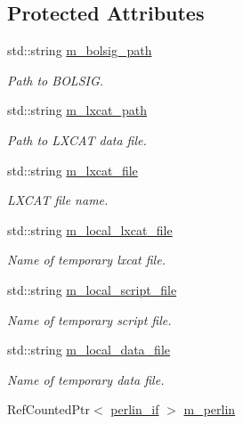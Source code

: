 \subsection*{Protected Attributes}
\begin{DoxyCompactItemize}
\item 
std\+::string \hyperlink{classair__bolsig_afe5060d9010503047c6d343384f66d8f}{m\+\_\+bolsig\+\_\+path}
\begin{DoxyCompactList}\small\item\em Path to B\+O\+L\+S\+IG. \end{DoxyCompactList}\item 
std\+::string \hyperlink{classair__bolsig_a8c7a6ec683fb0837a02b6c0ecb481d62}{m\+\_\+lxcat\+\_\+path}
\begin{DoxyCompactList}\small\item\em Path to L\+X\+C\+AT data file. \end{DoxyCompactList}\item 
std\+::string \hyperlink{classair__bolsig_a152aa89256eb186e1f193978a77c0305}{m\+\_\+lxcat\+\_\+file}
\begin{DoxyCompactList}\small\item\em L\+X\+C\+AT file name. \end{DoxyCompactList}\item 
std\+::string \hyperlink{classair__bolsig_a4c853bc283b17d6229090ad3a697e3a3}{m\+\_\+local\+\_\+lxcat\+\_\+file}
\begin{DoxyCompactList}\small\item\em Name of temporary lxcat file. \end{DoxyCompactList}\item 
std\+::string \hyperlink{classair__bolsig_ae71a5e3e615ba0d1511a0527e0bffe23}{m\+\_\+local\+\_\+script\+\_\+file}
\begin{DoxyCompactList}\small\item\em Name of temporary script file. \end{DoxyCompactList}\item 
std\+::string \hyperlink{classair__bolsig_aef86376e75796500da5a46ca1264c37b}{m\+\_\+local\+\_\+data\+\_\+file}
\begin{DoxyCompactList}\small\item\em Name of temporary data file. \end{DoxyCompactList}\item 
Ref\+Counted\+Ptr$<$ \hyperlink{classperlin__if}{perlin\+\_\+if} $>$ \hyperlink{classair__bolsig_aa6084fec29a2f45ae6438d68bc1b2ecc}{m\+\_\+perlin}

\end{DoxyCompactItemize}

